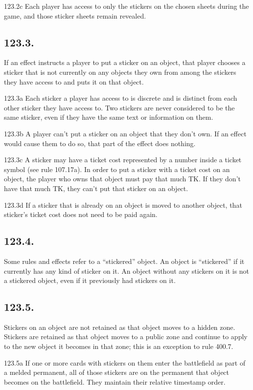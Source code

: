123.2c Each player has access to only the stickers on the chosen sheets during the game, and those sticker sheets remain revealed.

\subsection*{123.3.}
If an effect instructs a player to put a sticker on an object, that player chooses a sticker that is not currently on any objects they own from among the stickers they have access to and puts it on that object.

123.3a Each sticker a player has access to is discrete and is distinct from each other sticker they have access to. Two stickers are never considered to be the same sticker, even if they have the same text or information on them.

123.3b A player can’t put a sticker on an object that they don’t own. If an effect would cause them to do so, that part of the effect does nothing.

123.3c A sticker may have a ticket cost represented by a number inside a ticket symbol (see rule 107.17a). In order to put a sticker with a ticket cost on an object, the player who owns that object must pay that much {TK}. If they don’t have that much {TK}, they can’t put that sticker on an object.

123.3d If a sticker that is already on an object is moved to another object, that sticker’s ticket cost does not need to be paid again.

\subsection*{123.4.}
Some rules and effects refer to a “stickered” object. An object is “stickered” if it currently has any kind of sticker on it. An object without any stickers on it is not a stickered object, even if it previously had stickers on it.

\subsection*{123.5.}
Stickers on an object are not retained as that object moves to a hidden zone. Stickers are retained as that object moves to a public zone and continue to apply to the new object it becomes in that zone; this is an exception to rule 400.7.

123.5a If one or more cards with stickers on them enter the battlefield as part of a melded permanent, all of those stickers are on the permanent that object becomes on the battlefield. They maintain their relative timestamp order.

